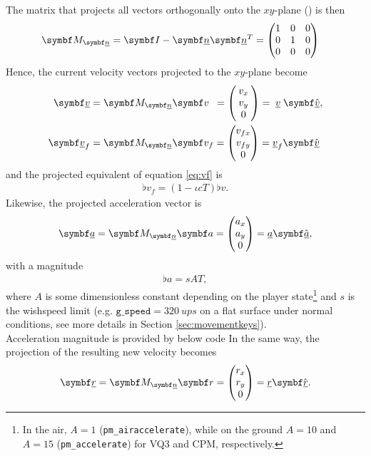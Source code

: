 The matrix that projects all vectors orthogonally onto the $xy$-plane (\greenarea) is then
\begin{align*}
\resprojmat{\flat{n}} = \mat{I} - \vec{\flat{n}} \vec{\flat{n}}^T &=
\begin{pmatrix}
1 & 0 & 0\\
0 & 1 & 0\\
0 & 0 & 0
\end{pmatrix}
\end{align*}
Hence, the current velocity vectors projected to the $xy$-plane become
\begin{align*}
\vec{\flat{v}} &= \resprojmat{\flat{n}} \vec{v}\hphantom{_f} =
\begin{pmatrix}
\mathmakebox[\widthof{$v_{fx}$}]{v_x} \\ v_y \\0
\end{pmatrix} = \mathmakebox[\widthof{$\flat{v}_f$}]{\flat{v}} \uvec{\flat{v}},\\
\vec{\flat{v}}_f &= \resprojmat{\flat{n}} \vec{v}_f =
\begin{pmatrix}
v_{fx} \\ v_{fy} \\0
\end{pmatrix} = \flat{v}_f \uvec{\flat{v}}
\end{align*}
and the projected equivalent of equation \eqref{eq:vf} is
\begin{align}
\label{eq:flat_vf}
\flat{v}_f = (1 - \iota cT) \flat{v}.
\end{align}
Likewise, the projected acceleration vector is
\begin{align}
\label{eq:accel_direction}
\vec{\flat{a}} = \resprojmat{\flat{n}} \vec{a} =
\begin{pmatrix}
a_x \\ a_y \\0
\end{pmatrix} = \flat{a} \uvec{\flat{a}},
\end{align}
with a magnitude
\begin{align}
\label{eq:sAT}
\flat{a} = sAT,
\end{align}
where $A$ is some dimensionless constant depending on the player state\footnote{In the air, $A = 1$ (\texttt{pm\_airaccelerate}), while on the ground $A = 10$ and $A = 15$ (\texttt{pm\_accelerate}) for VQ3 and CPM, respectively.} and $s$ is the wishspeed limit (e.g. $\texttt{g\_speed} = \qty{320}{ups}$ on a flat surface under normal conditions, see more details in Section \ref{sec:movementkeys}).\\
Acceleration magnitude is provided by below code
In the same way, the projection of the resulting new velocity becomes
\begin{align*}
\vec{\flat{r}} = \resprojmat{\flat{n}} \vec{r} =
\begin{pmatrix}
r_x \\ r_y \\0
\end{pmatrix} = \flat{r} \uvec{\flat{r}}.
\end{align*}


